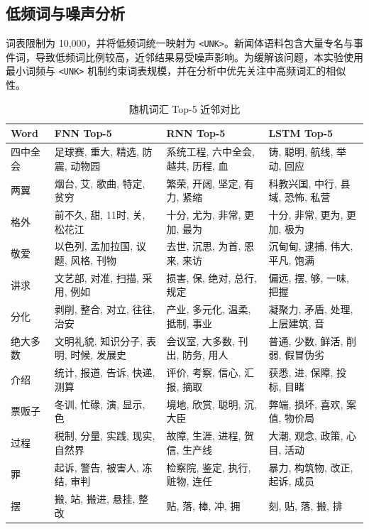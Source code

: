 \documentclass[11pt]{article}
\begin{document}
\subsection{低频词与噪声分析}
词表限制为 10,000，并将低频词统一映射为 \texttt{<UNK>}。新闻体语料包含大量专名与事件词，导致低频词比例较高，近邻结果易受噪声影响。为缓解该问题，本实验使用最小词频与 \texttt{<UNK>} 机制约束词表规模，并在分析中优先关注中高频词汇的相似性。

\begin{table}[H]
    \centering
    \caption{随机词汇 Top-5 近邻对比}
    \small
    \begin{tabularx}{\textwidth}{p{2.4cm}X X X}
        \toprule
        Word & FNN Top-5 & RNN Top-5 & LSTM Top-5 \\
        \midrule
        四中全会 & 足球赛, 重大, 精选, 防震, 动物园 & 系统工程, 六中全会, 越共, 历程, 血 & 铸, 聪明, 航线, 举动, 回应 \\
        两翼 & 烟台, 艾, 歌曲, 特定, 贫穷 & 繁荣, 开阔, 坚定, 有力, 紧缩 & 科教兴国, 中行, 县域, 恐怖, 私营 \\
        格外 & 前不久, 甜, 11时, 关, 松花江 & 十分, 尤为, 非常, 更加, 最为 & 十分, 非常, 更为, 更加, 极为 \\
        敬爱 & 以色列, 孟加拉国, 议题, 风格, 刊物 & 去世, 沉思, 为首, 恩来, 来访 & 沉甸甸, 逮捕, 伟大, 平凡, 饱满 \\
        讲求 & 文艺部, 对准, 扫描, 采用, 例如 & 损害, 保, 绝对, 总行, 规定 & 偏远, 摆, 够, 一味, 把握 \\
        分化 & 剥削, 整合, 对立, 往往, 治安 & 产业, 多元化, 温柔, 抵制, 事业 & 凝聚力, 矛盾, 处理, 上层建筑, 音 \\
        绝大多数 & 文明礼貌, 知识分子, 表明, 时候, 发展史 & 会议室, 大多数, 刊出, 防务, 用人 & 普通, 少数, 鲜活, 削弱, 假冒伪劣 \\
        介绍 & 统计, 报道, 告诉, 快递, 测算 & 评价, 考察, 信心, 汇报, 摘取 & 获悉, 进, 保障, 投标, 目睹 \\
        票贩子 & 冬训, 忙碌, 演, 显示, 色 & 境地, 欣赏, 聪明, 沉, 大臣 & 弊端, 损坏, 喜欢, 案值, 物价局 \\
        过程 & 税制, 分量, 实践, 现实, 自然界 & 故障, 生涯, 进程, 贺信, 生产线 & 大潮, 观念, 政策, 心目, 活动 \\
        罪 & 起诉, 警告, 被害人, 冻结, 审判 & 检察院, 鉴定, 执行, 赃物, 连任 & 暴力, 构筑物, 改正, 起诉, 成员 \\
        摆 & 搬, 站, 搬进, 悬挂, 整改 & 贴, 落, 棒, 冲, 拥 & 刻, 贴, 落, 搬, 排 \\
        \bottomrule
    \end{tabularx}
    \label{tab:case}
\end{table}
\end{document}
